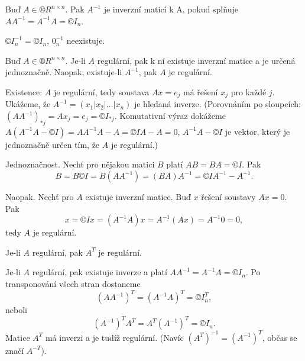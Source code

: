 \documentclass[12pt]{article}					%
\begin{document}
    \begin{definice}
        Buď $A \in ®R^{n\times n}$. Pak $A^{-1}$ je inverzní maticí k A, pokud splňuje $AA^{-1} = A^{-1}A = ©I_n$.

        \begin{prikladyin}
            $©I_n^{-1} = ©I_n$, $0_n^{-1}$ neexistuje.
        \end{prikladyin}
    \end{definice}

    \begin{veta}
        Buď $A \in ®R^{n\times n}$. Je-li $A$ regulární, pak k ní existuje inverzní matice a je určená jednoznačně. Naopak, existuje-li $A^{-1}$, pak $A$ je regulární.

        \begin{dukazin}
                Existence: $A$ je regulární, tedy soustava $Ax = e_j$ má řešení $x_j$ pro každé $j$. Ukážeme, že $A^{-1} = (x_1 | x_2 | … | x_n)$ je hledaná inverze. (Porovnáním po sloupcích: $(AA^{-1})_{*j} = Ax_j = e_j = ©I_{*j}$. Komutativní výraz dokážeme $A(A^{-1}A - ©I) = AA^{-1}A - A = ©IA - A = 0$, $A^{-1}A - ©I$ je vektor, který je jednoznačně určen tím, že $A$ je regulární.)

                Jednoznačnost. Nechť pro nějakou matici $B$ platí $AB = BA = ©I$. Pak
                $$ B = B©I = B(AA^{-1}) = (BA)A^{-1} = ©IA^{-1} - A^{-1}. $$ 

                Naopak. Nechť pro $A$ existuje inverzní matice. Buď $x$ řešení soustavy $Ax = 0$. Pak
                $$ x = ©Ix = (A^{-1}A)x = A^{-1}(Ax) = A^{-1}0 = 0, $$ 
                tedy $A$ je regulární.
        \end{dukazin}
    \end{veta}

    \begin{tvrzeni}
        Je-li $A$ regulární, pak $A^T$ je regulární.
        \begin{dukazin}
            Je-li $A$ regulární, pak existuje inverze a platí $AA^{-1} = A^{-1}A = ©I_n$. Po transponování všech stran dostaneme
            $$(AA^{-1})^T = (A^{-1}A)^T = ©I_n^T,$$
            neboli
            $$ (A^{-1})^TA^T = A^T(A^{-1})^T = ©I_n. $$ 
            Matice $A^T$ má inverzi a je tudíž regulární. (Navíc $(A^T)^{-1} = (A^{-1})^T$, občas se značí $A^{-T}$).
        \end{dukazin}
    \end{tvrzeni}
\end{document}
